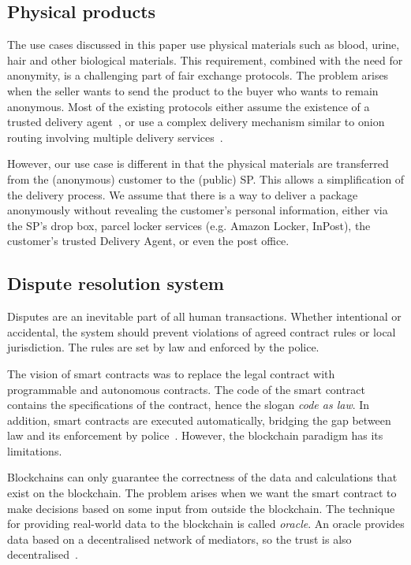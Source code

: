 \documentclass[pdftex,twocolumn,epjc3]{svjour3}
\begin{document}
{\subsection{Physical products}\label{sec:physical-products}
The use cases discussed in this paper use physical materials such as blood, urine, hair and other biological materials.
This requirement, combined with the need for anonymity, is a challenging part of fair exchange protocols. The problem arises when the seller wants to send the product to the buyer who wants to remain anonymous. Most of the existing protocols either assume the existence of a trusted delivery agent~\cite{mohammedalarajFairnessPhysicalProducts2012,birjoveanuAnonymityFairexchangeEcommerce2015}, or use a complex delivery mechanism similar to onion routing involving multiple delivery services~\cite{altawyLelantosBlockchainBasedAnonymous2017}. 

However, our use case is different in that the physical materials are transferred from the (anonymous) customer to the (public) SP. This allows a simplification of the delivery process. We assume that there is a way to deliver a package anonymously without revealing the customer's personal information, either via the SP's drop box, parcel locker services (e.g. Amazon Locker, InPost), the customer's trusted Delivery Agent, or even the post office.

\subsection{Dispute resolution system}
\label{sec:dispute-resolution}
Disputes are an inevitable part of all human transactions. Whether intentional or accidental, the system should prevent violations of agreed contract rules or local jurisdiction. The rules are set by law and enforced by the police.

The vision of smart contracts was to replace the legal contract with
programmable and autonomous contracts. The code of the smart contract contains the specifications of the contract, hence the slogan \textit{code as law}. In addition, smart contracts are executed automatically, bridging the gap between law and its enforcement by police~\cite{allenGovernanceBlockchainDispute2019}. However, the blockchain paradigm has its limitations. 
 
Blockchains can only guarantee the correctness of the data and calculations that exist on the blockchain. The problem arises when we want the smart contract to make decisions based on some input from outside the blockchain. The technique for providing real-world data to the blockchain is called \textit{oracle}. An oracle provides data based on a decentralised network of mediators, so the trust is also decentralised~\cite{breidenbachChainlinkNextSteps2021}.

}
\end{document}
